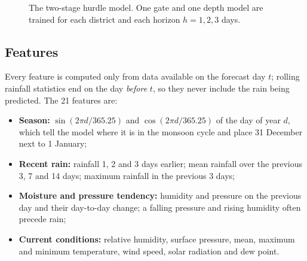\begin{figure}[H]
\centering
{}
\caption{The two-stage hurdle model. One gate and one depth model are trained for each district and each horizon $h = 1, 2, 3$ days.}
\label{fig:hurdle}
\end{figure}

\subsection{Features}
Every feature is computed only from data available on the forecast day $t$; rolling rainfall statistics end on the day \emph{before} $t$, so they never include the rain being predicted. The 21 features are:
\begin{itemize}
	\item \textbf{Season:} $\sin(2\pi d/365.25)$ and $\cos(2\pi d/365.25)$ of the day of year $d$, which tell the model where it is in the monsoon cycle and place 31 December next to 1 January;
	\item \textbf{Recent rain:} rainfall 1, 2 and 3 days earlier; mean rainfall over the previous 3, 7 and 14 days; maximum rainfall in the previous 3 days;
	\item \textbf{Moisture and pressure tendency:} humidity and pressure on the previous day and their day-to-day change; a falling pressure and rising humidity often precede rain;
	\item \textbf{Current conditions:} relative humidity, surface pressure, mean, maximum and minimum temperature, wind speed, solar radiation and dew point.
\end{itemize}

